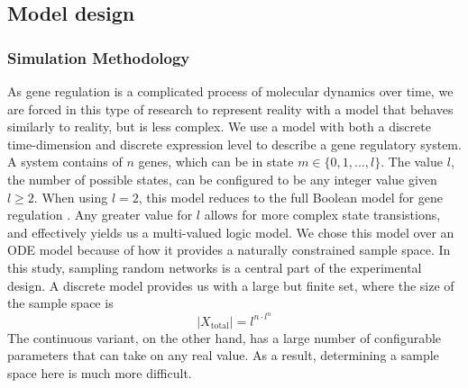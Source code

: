 \documentclass[../main.tex]{subfiles}
\begin{document}
\subsection{Model design}

\subsubsection{Simulation Methodology}

As gene regulation is a complicated process of molecular dynamics over time, we are forced in this type of research to represent reality with a model that behaves similarly to reality, but is less complex.
We use a model with both a discrete time-dimension and discrete expression level to describe a gene regulatory system.
A system contains of $n$ genes, which can be in state $m \in \{0, 1, ..., l\}$.
The value $l$, the number of possible states, can be configured to be any integer value given $l \ge 2$.
When using $l = 2$, this model reduces to the full Boolean model for gene regulation \cite{bolouri2002modeling}.
Any greater value for $l$ allows for more complex state transistions, and effectively yields us a multi-valued logic model.
We chose this model over an ODE model because of how it provides a naturally constrained sample space.
In this study, sampling random networks is a central part of the experimental design.
A discrete model provides us with a large but finite set, where the size of the sample space is
%
\begin{equation}
|X_\mathrm{total}| = l^{n \cdot l^n}
\end{equation}
%
The continuous variant, on the other hand, has a large number of configurable parameters that can take on any real value.
As a result, determining a sample space here is much more difficult.
\end{document}
